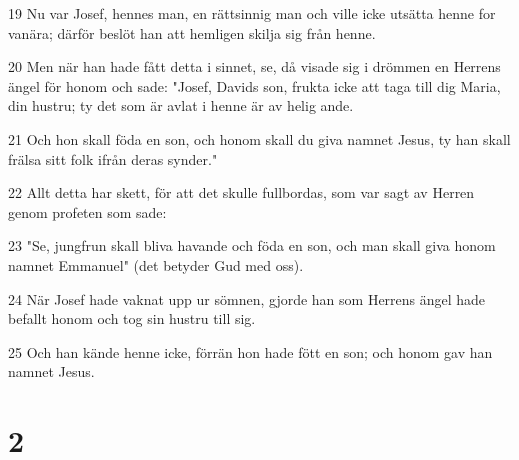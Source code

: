\par 19 Nu var Josef, hennes man, en rättsinnig man och ville icke utsätta henne for vanära; därför beslöt han att hemligen skilja sig från henne.
\par 20 Men när han hade fått detta i sinnet, se, då visade sig i drömmen en Herrens ängel för honom och sade: "Josef, Davids son, frukta icke att taga till dig Maria, din hustru; ty det som är avlat i henne är av helig ande.
\par 21 Och hon skall föda en son, och honom skall du giva namnet Jesus, ty han skall frälsa sitt folk ifrån deras synder."
\par 22 Allt detta har skett, för att det skulle fullbordas, som var sagt av Herren genom profeten som sade:
\par 23 "Se, jungfrun skall bliva havande och föda en son, och man skall giva honom namnet Emmanuel" (det betyder Gud med oss).
\par 24 När Josef hade vaknat upp ur sömnen, gjorde han som Herrens ängel hade befallt honom och tog sin hustru till sig.
\par 25 Och han kände henne icke, förrän hon hade fött en son; och honom gav han namnet Jesus.

\chapter{2}

